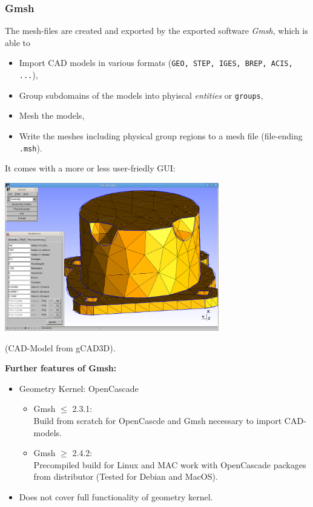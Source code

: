 \begin{frame}
  \frametitle{Gmsh}
  The mesh-files are created and exported by the exported software \emph{Gmsh},
  which is able to
  \begin{itemize}
    \item Import CAD models in various formats
      (\lstinline!GEO, STEP, IGES, BREP, ACIS, ...!),
    \item Group subdomains of the models into phyiscal \emph{entities} or
      \lstinline{groups},
    \item Mesh the models,
    \item Write the meshes including physical group regions to a mesh file
      (file-ending \lstinline!.msh!).
  \end{itemize}
  It comes with a more or less user-friedly GUI:
  \begin{center}
    \includegraphics[width=0.7\textwidth]{./EPS/gcad3d_deckel}
  \end{center}
  {\tiny (CAD-Model from gCAD3D).}

  \textbf{Further features of Gmsh:}
  \begin{itemize}
    \item Geometry Kernel: OpenCascade
      \begin{itemize}
        \item Gmsh $\leq$ 2.3.1:\\ Build from scratch for OpenCascde and Gmsh
          necessary to import CAD-models.
        \item Gmsh $\geq$ 2.4.2:\\ Precompiled build for Linux and MAC work with
          OpenCascade packages from distributor (Tested for Debian and MacOS).
      \end{itemize}
    \item Does not cover full functionality of geometry kernel.
  \end{itemize}
\end{frame}

